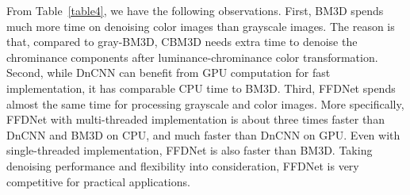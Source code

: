 \documentclass[journal]{IEEEtran}
\begin{document}
From Table~\ref{table4}, we have the following observations. First, BM3D spends much more time on denoising color images than grayscale images. The reason is that, compared to gray-BM3D, CBM3D needs extra time to denoise the chrominance components after luminance-chrominance color transformation. Second, while DnCNN can benefit from GPU computation for fast implementation, it has comparable CPU time to BM3D. Third, FFDNet spends almost the same time for processing grayscale and color images. More specifically, FFDNet with multi-threaded implementation is about three times faster than DnCNN and BM3D on CPU, and much faster than DnCNN on GPU. Even with single-threaded implementation, FFDNet is also faster than BM3D. Taking denoising performance and flexibility into consideration, FFDNet is very competitive for practical applications.
\end{document}
